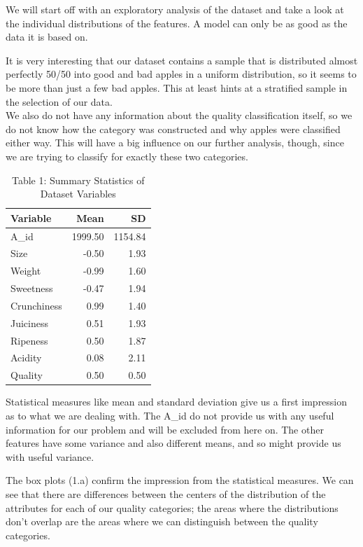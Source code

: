 \documentclass[
]{report}
\begin{document}
We will start off with an exploratory analysis of the dataset and take a
look at the individual distributions of the features. A model can only
be as good as the data it is based on.

It is very interesting that our dataset contains a sample that is
distributed almost perfectly 50/50 into good and bad apples in a uniform
distribution, so it seems to be more than just a few bad apples. This at
least hints at a stratified sample in the selection of our data.\\
We also do not have any information about the quality classification
itself, so we do not know how the category was constructed and why
apples were classified either way. This will have a big influence on our
further analysis, though, since we are trying to classify for exactly
these two categories.

\begin{table}
\caption*{
{\large Table 1: Summary Statistics of Dataset Variables}
} 
\fontsize{12.0pt}{14.4pt}\selectfont
\begin{tabular*}{\linewidth}{@{\extracolsep{\fill}}lrr}
\toprule
Variable & Mean & SD \\ 
\midrule\addlinespace[2.5pt]
A\_id & 1999.50 & 1154.84 \\ 
Size & -0.50 & 1.93 \\ 
Weight & -0.99 & 1.60 \\ 
Sweetness & -0.47 & 1.94 \\ 
Crunchiness & 0.99 & 1.40 \\ 
Juiciness & 0.51 & 1.93 \\ 
Ripeness & 0.50 & 1.87 \\ 
Acidity & 0.08 & 2.11 \\ 
Quality & 0.50 & 0.50 \\ 
\bottomrule
\end{tabular*}
\end{table}

Statistical measures like mean and standard deviation give us a first
impression as to what we are dealing with. The A\_id do not provide us
with any useful information for our problem and will be excluded from
here on. The other features have some variance and also different means,
and so might provide us with useful variance.

The box plots (1.a) confirm the impression from the statistical
measures. We can see that there are differences between the centers of
the distribution of the attributes for each of our quality categories;
the areas where the distributions don't overlap are the areas where we
can distinguish between the quality categories.
\end{document}
